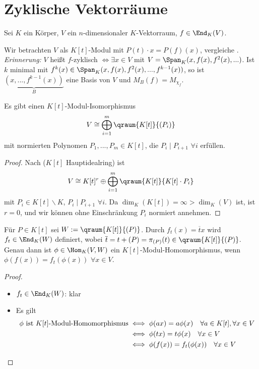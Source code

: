 \section{Zyklische Vektorräume}

Sei $K$ ein Körper, $V$ ein $n$-dimensionaler $K$-Vektorraum, $f\in\End_K(V)$.

\begin{remark}
	Wir betrachten $V$ als $K[t]$-Modul mit $P(t)\cdot x=P(f)(x)$, vergleiche . \\
	\emph{Erinnerung:} $V$ heißt $f$-zyklisch $\iff \exists x\in V$ mit $V=\Span_K(x,f(x),f^2(x),...)$. Ist $k$ minimal mit $f^k(x)\in\Span_K(x,f(x),f^2(x),...,f^{k-1}(x))$, so ist $\underbrace{(x,...,f^{k-1}(x))}_{B}$ eine Basis von $V$ und $M_B(f)=M_{\chi_f}$.
\end{remark}

\begin{proposition}
	Es gibt einen $K[t]$-Modul-Isomorphismus
	\begin{align}
		V\cong \bigoplus_{i=1}^m\qraum{K[t]}{(P_i)}\notag
	\end{align}
	mit normierten Polynomen $P_1,...,P_m\in K[t]$, die $P_i\mid P_{i+1}$ $\forall i$ erfüllen.
\end{proposition}
\begin{proof}
	Nach  ($K[t]$ Hauptidealring) ist 
	\begin{align}
		V\cong K[t]^r\oplus\bigoplus_{i=1}^m \qraum{K[t]}{K[t]\cdot P_i}\notag
	\end{align}
	mit $P_i\in K[t]\backslash K$, $P_i\mid P_{i+1}$ $\forall i$. Da $\dim_K(K[t])=\infty>\dim_K(V)$ ist, ist $r=0$, und wir können ohne Einschränkung $P_i$ normiert annehmen.
\end{proof}

\begin{lemma}
	Für $P\in K[t]$ sei $W:=\qraum{K[t]}{(P)}$. Durch $f_t(x)=\overline{t}x$ wird $f_t\in\End_K(W)$ definiert, wobei $\overline{t}=t+(P)=\pi_{(P)}(t)\in \qraum{K[t]}{(P)}$. Genau dann ist $\phi\in\Hom_K(V,W)$ ein $K[t]$-Modul-Homomorphismus, wenn $\phi(f(x))=f_t(\phi(x))$ $\forall x\in V$.
\end{lemma}
\begin{proof}
	\begin{itemize}
		\item $f_t\in\End_K(W)$: klar
		\item Es gilt
		\begin{align}
			\phi\text{ ist } K[t]\text{-Modul-Homomorphismus} &\iff \phi(ax)=a\phi(x)\quad\forall a\in K[t],\forall x\in V \notag \\
			&\iff \phi(tx)=t\phi(x)\quad\forall x\in V \notag \\
			&\iff \phi(f(x))=f_t(\phi(x))\quad\forall x\in V\notag
		\end{align}
	\end{itemize}
\end{proof}

